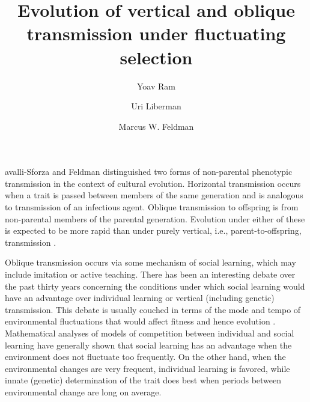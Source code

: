 \documentclass[9pt,twocolumn,twoside,lineno]{pnas-new}
\title{Evolution of vertical and oblique transmission under fluctuating selection}
\author[a]{Yoav Ram}
\author[b]{Uri Liberman}
\author[a,1]{Marcus W. Feldman}
\affil[a]{Department of Biology, Stanford University, Stanford, CA 94305-5020}
\affil[b]{School of Mathematical Sciences, Tel Aviv University}
\begin{document}

\maketitle
\thispagestyle{firststyle}

avalli-Sforza and Feldman \cite{cavalli1981cultural} distinguished two forms of non-parental phenotypic transmission in the context of cultural evolution. Horizontal transmission  occurs when a trait is passed between members of the same generation and is analogous to transmission of an infectious agent. Oblique transmission to offspring is from non-parental members of the parental generation. Evolution under either of these is expected to be more rapid than under purely vertical, i.e., parent-to-offspring, transmission \cite{lycett2008questions,bergstrom2012evolution}.

Oblique transmission occurs via some mechanism of social learning, which may include imitation or active teaching. There has been an interesting debate over the past thirty years concerning the conditions under which social learning would have an advantage over individual learning or vertical (including genetic) transmission. This debate is usually couched in terms of the mode and tempo of environmental fluctuations that would affect fitness and hence evolution \cite{rogers1988does,boyd1988evolutionary,boyd1995does,feldman1996individual,wakano2004evolution,aoki2005emergence,wakano2006mixed,aoki2014evolution}. 
Mathematical analyses of models of competition between individual and social learning have generally shown that social learning has an advantage when the environment does not fluctuate too frequently. On the other hand, when the environmental changes are very frequent, individual learning is favored, while innate (genetic) determination of the trait does best when periods between environmental change are long on average.
\end{document}
